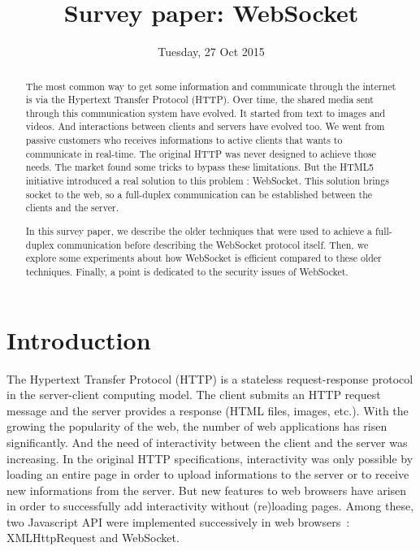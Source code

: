 \documentclass[10pt,journal,compsoc]{IEEEtran}
\newcommand{\ws}{WebSocket}
\begin{document}
\author{}

\title{Survey paper: \ws}

\date{Tuesday, 27 Oct 2015}

\maketitle
\IEEEpeerreviewmaketitle



\begin{abstract}
The most common way to get some information and communicate through the internet is via the Hypertext Transfer Protocol (HTTP).
Over time, the shared media sent through this communication system have evolved.
It started from text to images and videos.
And interactions between clients and servers have evolved too.
We went from passive customers who receives informations to active clients that wants to communicate in real-time.
The original HTTP was never designed to achieve those needs.
The market found some tricks to bypass these limitations.
But the HTML5 initiative introduced a real solution to this problem : \ws{}.
This solution brings socket to the web, so a full-duplex communication can be established between the clients and the server.

In this survey paper, we describe the older techniques that were used to achieve a full-duplex communication before describing the \ws{} protocol itself.
Then, we explore some experiments about how \ws{} is efficient compared to these older techniques.
Finally, a point is dedicated to the security issues of \ws.
\end{abstract}


\section{Introduction}

The Hypertext Transfer Protocol (HTTP) is a stateless request-response protocol in the server-client computing model.
The client submits an HTTP request message and the server provides a response (HTML files, images, etc.).
With the growing the popularity of the web, the number of web applications has risen significantly.
And the need of interactivity between the client and the server was increasing.
In the original HTTP specifications, interactivity was only possible by loading an entire page in order to upload informations to the server or to receive new informations from the server.
But new features to web browsers have arisen in order to successfully add interactivity without (re)loading pages.
Among these, two Javascript API were implemented successively in web \mbox{browsers :} XMLHttpRequest and \ws.
\end{document}
